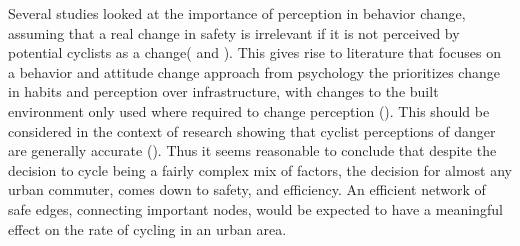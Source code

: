 \documentclass[11pt]{article} %
\begin{document}
Several studies looked at the importance of perception in behavior change, assuming that a real change in safety is irrelevant if it is not perceived by potential cyclists as a change(\cite{li2012physical} and \cite{parkin2007models}). This gives rise to literature that focuses on a behavior and attitude change approach from psychology the prioritizes change in habits and perception over infrastructure, with changes to the built environment only used where required to change perception (\cite{savan2017integrated}). This should be considered in the context of research showing that cyclist perceptions of danger are generally accurate (\cite{vandenbulcke2014predicting}). Thus it seems reasonable to conclude that despite the decision to cycle being a fairly complex mix of factors, the decision for almost any urban commuter, comes down to safety, and efficiency. An efficient network of safe edges, connecting important nodes, would be expected to have a meaningful effect on the rate of cycling in an urban area.  

%
%
%
%
%
%
%
%
%
\end{document}
